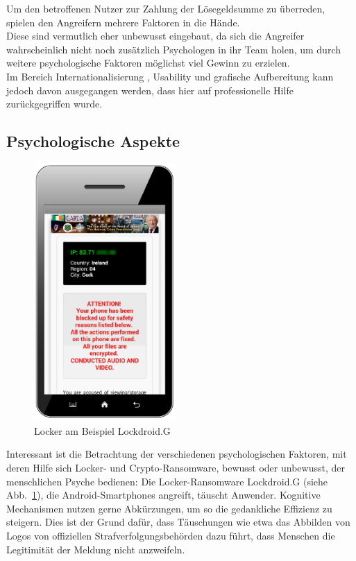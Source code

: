 Um den betroffenen Nutzer zur Zahlung der Lösegeldsumme zu überreden, spielen den Angreifern mehrere Faktoren in die Hände. \\
Diese sind vermutlich eher unbewusst eingebaut, da sich die Angreifer wahrscheinlich nicht noch zusätzlich Psychologen in ihr Team holen, um durch weitere psychologische Faktoren möglichst viel Gewinn zu erzielen. \\
Im Bereich Internationalisierung \cite{faktoren:l18n}, Usability und grafische Aufbereitung \cite{faktoren:grafik} \cite{evolution} kann jedoch davon ausgegangen werden, dass hier auf professionelle Hilfe zurückgegriffen wurde.

\subsection{Psychologische Aspekte}

\begin{figure}
  \begin{center}
    \includegraphics[width=0.48\textwidth]{img/android_locker.png}
  \end{center}
  \caption{Locker am Beispiel \glqq Lockdroid.G\grqq{} \cite{evolution}}
  \label{fig:lockdroid}
\end{figure}
Interessant ist die Betrachtung der verschiedenen psychologischen Faktoren, mit deren Hilfe sich Locker- und Crypto-Ransomware, bewusst oder unbewusst, der menschlichen Psyche bedienen:
Die Locker-Ransomware \glqq Lockdroid.G\grqq{} (siehe Abb.~\ref{fig:lockdroid}), die Android-Smartphones angreift, täuscht Anwender. Kognitive Mechanismen nutzen gerne Abkürzungen, um so die gedankliche Effizienz zu steigern. Dies ist der Grund dafür, dass Täuschungen wie etwa das Abbilden von Logos von offiziellen Strafverfolgungsbehörden dazu führt, dass Menschen die Legitimität der Meldung nicht anzweifeln. 



